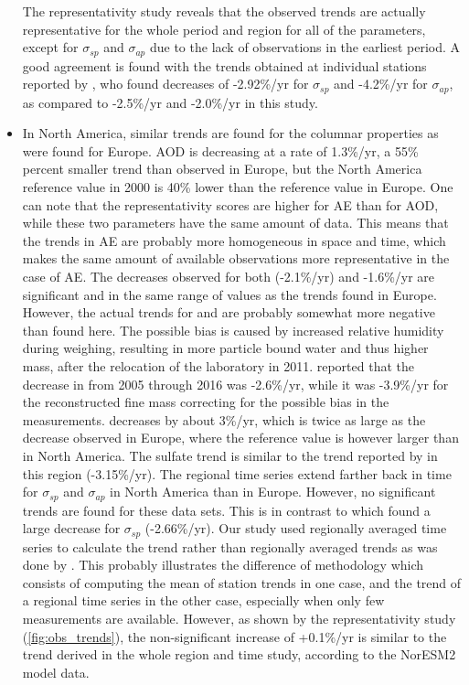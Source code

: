 \documentclass[acp, manuscript]{copernicus}
\begin{document}
\begin{itemize}
 The representativity study reveals that the observed trends are actually representative for the whole period and region for all of the parameters, except for $\sigma_{sp}$ and $\sigma_{ap}$ due to the lack of observations in the earliest period. A good agreement is found with the trends obtained at individual stations reported by \cite{collaudcoen-2019}, who found decreases of -2.92\%/yr for $\sigma_{sp}$ and -4.2\%/yr for $\sigma_{ap}$, as compared to -2.5\%/yr and -2.0\%/yr in this study.
 \item In North America, similar trends are found for the columnar properties as were found for Europe. AOD is decreasing at a rate of 1.3\%/yr, a 55\% percent smaller trend than observed in Europe, but the North America reference value in 2000 is 40\% lower than the reference value in Europe. One can note that the representativity scores are higher for AE than for AOD, while these two parameters have the same amount of data. This means that the trends in AE are probably more homogeneous in space and time, which makes the same amount of available observations more representative in the case of AE. The decreases observed for both  (-2.1\%/yr) and  -1.6\%/yr are significant and in the same range of values as the trends found in Europe. However, the actual trends for  and  are probably somewhat more negative than found here. The possible bias is caused by increased relative humidity during weighing, resulting in more particle bound water and thus higher mass, after the relocation of the laboratory in 2011. \cite{Hand2019} reported that the  decrease in  from 2005 through 2016 was -2.6\%/yr, while it was -3.9\%/yr for the reconstructed fine mass correcting for the possible bias in the measurements.  decreases by about 3\%/yr, which is twice as large as the decrease observed in Europe, where the reference value is however larger than in North America. The sulfate trend is similar to the trend reported by \cite{aas2019global} in this region (-3.15\%/yr). The regional time series extend farther back in time for $\sigma_{sp}$ and $\sigma_{ap}$ in North America than in Europe. However, no significant trends are found for these data sets. This is in contrast to \cite{collaudcoen-2019} which found a large decrease for $\sigma_{sp}$ (-2.66\%/yr). Our study used regionally averaged time series to calculate the trend rather than regionally averaged trends as was done by \cite{collaudcoen-2019}. This probably illustrates the difference of methodology which consists of computing the mean of station trends in one case, and the trend of a regional time series in the other case, especially when only few measurements are available. However, as shown by the representativity study (\ref{fig:obs_trends}), the non-significant increase of +0.1\%/yr is similar to the trend derived in the whole region and time study, according to the NorESM2 model data.

\end{itemize}
\end{document}
